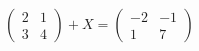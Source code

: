 \hspace*{2mm}\begin{minipage}[t]{\dimexpr\linewidth-2mm\relax}\vspace{0pt}
$\begin{pmatrix} 2 & 1 \\ 3 & 4 \end{pmatrix}+X=\begin{pmatrix} -2 & -1 \\ 1 & 7 \end{pmatrix}$\end{minipage}
